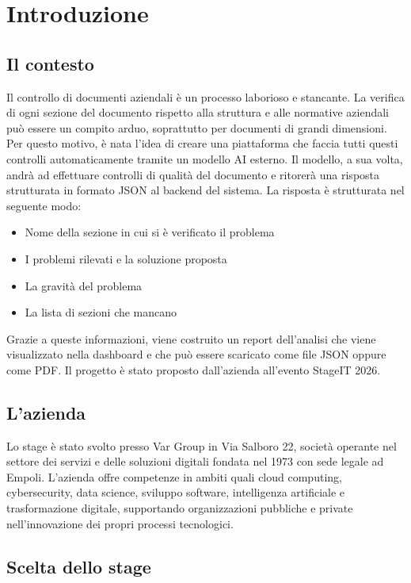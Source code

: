 \chapter{Introduzione}
\label{cap:introduzione}

\section{Il contesto}

Il controllo di documenti aziendali è un processo laborioso e stancante. 
La verifica di ogni sezione del documento rispetto alla struttura e alle normative aziendali può essere un compito arduo, soprattutto per documenti di grandi dimensioni.
Per questo motivo, è nata l'idea di creare una piattaforma che faccia tutti questi controlli automaticamente tramite un modello AI esterno. 
Il modello, a sua volta, andrà ad effettuare controlli di qualità del documento e ritorerà una risposta strutturata in formato JSON al backend del sistema. La risposta è strutturata nel seguente modo:
\begin{itemize}
    \item Nome della sezione in cui si è verificato il problema
    \item I problemi rilevati e la soluzione proposta
    \item La gravità del problema
    \item La lista di sezioni che mancano
\end{itemize}
Grazie a queste informazioni, viene costruito un report dell'analisi che viene visualizzato nella dashboard e che può essere scaricato come file JSON oppure come PDF. Il progetto è stato proposto dall'azienda all'evento StageIT 2026.
\section{L'azienda}
Lo stage è stato svolto presso Var Group in Via Salboro 22, società operante nel settore dei servizi e delle soluzioni digitali fondata nel 1973 con sede legale ad Empoli.
L'azienda offre competenze in ambiti quali cloud computing, cybersecurity, data science, sviluppo software, intelligenza artificiale e trasformazione digitale, supportando organizzazioni pubbliche e private nell'innovazione dei propri processi tecnologici. \\


\section{Scelta dello stage}

